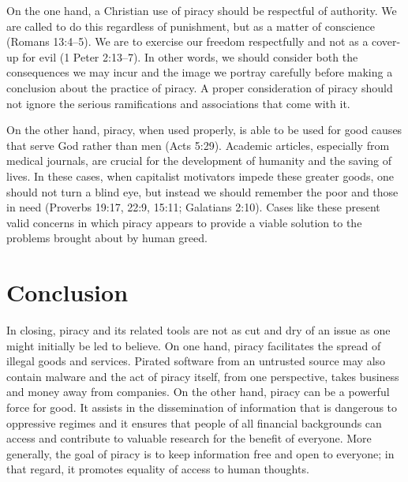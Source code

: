 \documentclass[onecolumn, 12pt]{article}
\begin{document}
\begin{refsection}
On the one hand, a Christian use of piracy should be respectful of authority.
We are called to do this regardless of punishment, but as a matter of
conscience (Romans 13:4--5). We are to exercise our freedom respectfully and
not as a cover-up for evil (1 Peter 2:13--7). In other words, we should consider
both the consequences we may incur and the image we portray carefully before
making a conclusion about the practice of piracy. A proper consideration of
piracy should not ignore the serious ramifications and associations that come
with it.

On the other hand, piracy, when used properly, is able to be used for good
causes that serve God rather than men (Acts 5:29). Academic articles,
especially from medical journals, are crucial for the development of humanity
and the saving of lives. In these cases, when capitalist motivators impede these
greater goods, one should not turn a blind eye, but instead we should remember
the poor and those in need (Proverbs 19:17, 22:9, 15:11; Galatians 2:10). Cases
like these present valid concerns in which piracy appears to provide a viable
solution to the problems brought about by human greed.

\section{Conclusion}
In closing, piracy and its related tools are not as cut and dry of an issue as one might
initially be led to believe. On one hand, piracy facilitates the spread of illegal goods
and services. Pirated software from an untrusted source may also contain malware and the
act of piracy itself, from one perspective, takes business and money away from companies.
On the other hand, piracy can be a powerful force for good. It assists in the
dissemination of information that is dangerous to oppressive regimes and it ensures that
people of all financial backgrounds can access and contribute to valuable research for the
benefit of everyone. More generally, the goal of piracy is to keep information free and
open to everyone; in that regard, it promotes equality of access to human thoughts. 


\end{refsection}
\end{document}

